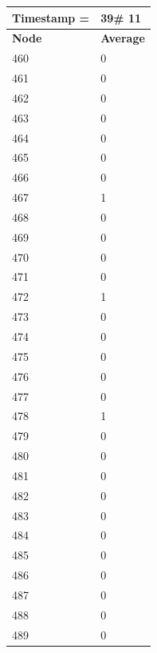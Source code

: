 \begin{tabular}{|l||l|}
\hline
\textbf{Timestamp =} & \textbf{39}\# 11\\\hline
	\textbf{Node} & \textbf{Average} \\ \hline
\hline
	460 & 0 \\ \hline
	461 & 0 \\ \hline
	462 & 0 \\ \hline
	463 & 0 \\ \hline
	464 & 0 \\ \hline
	465 & 0 \\ \hline
	466 & 0 \\ \hline
	467 & 1 \\ \hline
	468 & 0 \\ \hline
	469 & 0 \\ \hline
	470 & 0 \\ \hline
	471 & 0 \\ \hline
	472 & 1 \\ \hline
	473 & 0 \\ \hline
	474 & 0 \\ \hline
	475 & 0 \\ \hline
	476 & 0 \\ \hline
	477 & 0 \\ \hline
	478 & 1 \\ \hline
	479 & 0 \\ \hline
	480 & 0 \\ \hline
	481 & 0 \\ \hline
	482 & 0 \\ \hline
	483 & 0 \\ \hline
	484 & 0 \\ \hline
	485 & 0 \\ \hline
	486 & 0 \\ \hline
	487 & 0 \\ \hline
	488 & 0 \\ \hline
	489 & 0 \\ \hline
\end{tabular}

